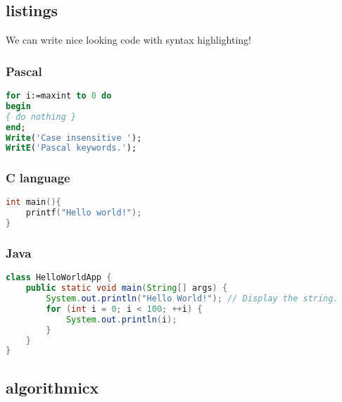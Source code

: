 \documentclass[12pt]{article} %
\begin{document}
\subsection{listings}

We can write nice looking code with syntax highlighting! 


\subsubsection{Pascal}

\begin{lstlisting}[language=Pascal]
for i:=maxint to 0 do
begin
{ do nothing }
end;
Write('Case insensitive ');
WritE('Pascal keywords.');
\end{lstlisting}

\subsubsection{C language}

\begin{lstlisting}[language=C]
int main(){
	printf("Hello world!");
}
\end{lstlisting}

\subsubsection{Java}

\begin{lstlisting}[language=java]
class HelloWorldApp {
    public static void main(String[] args) {
        System.out.println("Hello World!"); // Display the string.
        for (int i = 0; i < 100; ++i) {
            System.out.println(i);
        }
    }
}
\end{lstlisting}


\subsection{algorithmicx}
\end{document}
